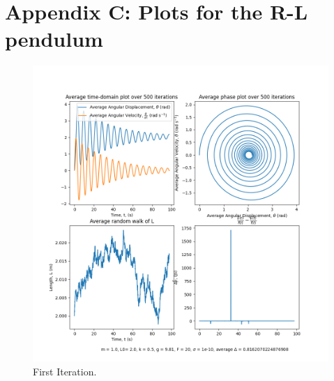 \documentclass[10pt, twocolumn]{article}
\begin{document}
\section{Appendix C: Plots for the R-L pendulum}{\label{rlplots}}
\begin{figure}[H]
    \centering
    \includegraphics[width = \columnwidth]{Projects/ForcedSimplePendulum/Plots/m = 1.0, L0= 2.0, k = 0.5, g = 9.81, F = 20, sigma = 1e-10, run number 0.png}
    \caption{First Iteration.}
    \label{First Iteration.}
\end{figure}
\end{document}
